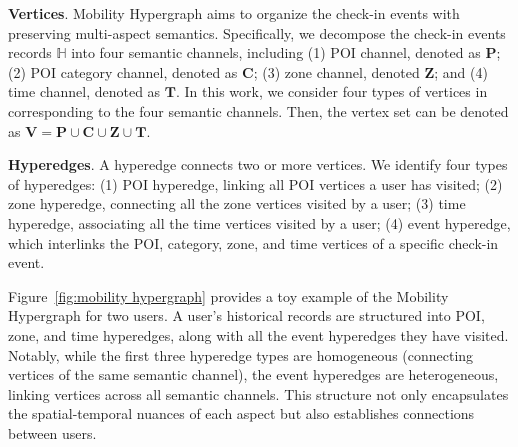 \documentclass[letterpaper]{article} %
\begin{document}
\noindent \textbf{Vertices}. 
Mobility Hypergraph aims to organize the check-in events with preserving multi-aspect semantics. 
Specifically, we decompose the check-in events records $\mathbb{H}$ into four semantic channels, including (1) POI channel, denoted as $\mathbf{P}$; (2) POI category channel, denoted as $\mathbf{C}$; (3) zone channel, denoted $\mathbf{Z}$; and (4) time channel, denoted as $\mathbf{T}$. 
In this work, we consider four types of vertices in corresponding to the four semantic channels. 
Then, the vertex set can be denoted as $\mathbf{V}= \mathbf{P} \cup \mathbf{C} \cup \mathbf{Z} \cup  \mathbf{T}$.



\noindent \textbf{Hyperedges}. 
A hyperedge connects two or more vertices. We identify four types of hyperedges:
(1) POI hyperedge, linking all POI vertices a user has visited;
(2) zone hyperedge, connecting all the zone vertices visited by a user;
(3) time hyperedge, associating all the time vertices visited by a user;
(4) event hyperedge, which interlinks the POI, category, zone, and time vertices of a specific check-in event.


Figure~\ref{fig:mobility hypergraph} provides a toy example of the Mobility Hypergraph for two users. A user's historical records are structured into POI, zone, and time hyperedges, along with all the event hyperedges they have visited. Notably, while the first three hyperedge types are homogeneous (connecting vertices of the same semantic channel), the event hyperedges are heterogeneous, linking vertices across all semantic channels. This structure not only encapsulates the spatial-temporal nuances of each aspect but also establishes connections between users.
\end{document}
